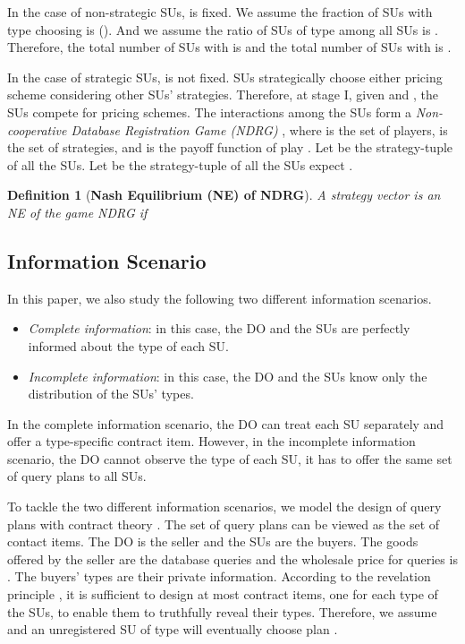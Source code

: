 \documentclass[journal]{IEEEtran}
\newtheorem{definition}{Definition}
\begin{document}
In the case of non-strategic SUs,  is fixed. We assume the fraction of SUs with type  choosing  is  (). And we assume the ratio of SUs of type  among all SUs is . Therefore, the total number of SUs with  is  and the total number of SUs with  is .

In the case of strategic SUs,  is not fixed. SUs strategically choose either pricing scheme considering other SUs' strategies.
Therefore, at stage I, given  and , the SUs compete for pricing schemes. The interactions among the SUs form a \emph{Non-cooperative Database Registration Game (NDRG)} , where  is the set of players,  is the set of strategies, and  is the payoff function of play . Let  be the strategy-tuple of all the SUs. Let  be the strategy-tuple of all the SUs expect .
\begin{definition}[\textbf{Nash Equilibrium (NE) of NDRG}]
A strategy vector  is an NE of the game NDRG if

\end{definition}

\subsection{Information Scenario}

In this paper, we also study the following two different information scenarios.
\begin{itemize}
  \item \emph{Complete information}: in this case, the DO and the SUs are perfectly informed about the type of each SU.
  \item \emph{Incomplete information}: in this case, the DO and the SUs know only the distribution of the SUs' types.
\end{itemize}

In the complete information scenario, the DO can treat each SU separately and offer a type-specific contract item. However, in the incomplete information scenario, the DO cannot observe the type of each SU, it has to offer the same set of query plans to all SUs.

To tackle the two different information scenarios, we model the design of query plans with contract theory \cite{contract_book}. The set of query plans  can be viewed as the set of contact items. The DO is the seller and the SUs are the buyers. The goods offered by the seller are the database queries and the wholesale price for  queries is . The buyers' types are their private information. According to the revelation principle \cite{contract_book}\cite{revelation}, it is sufficient to design at most  contract items, one for each type of the SUs, to enable them to truthfully reveal their types. Therefore, we assume  and an unregistered SU of type  will eventually choose plan .
\end{document}
